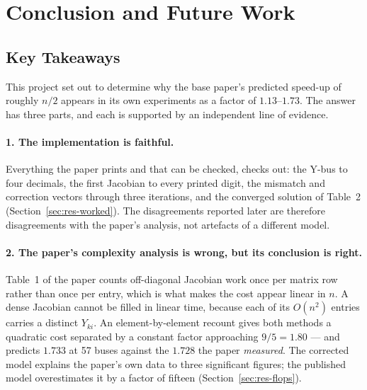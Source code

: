 \documentclass[sigconf,nonacm]{acmart}
\begin{document}
\section{Conclusion and Future Work}

\subsection{Key Takeaways}
This project set out to determine why the base paper's predicted speed-up of
roughly $n/2$ appears in its own experiments as a factor of $1.13$--$1.73$. The
answer has three parts, and each is supported by an independent line of
evidence.

\paragraph{1. The implementation is faithful.}
Everything the paper prints and that can be checked, checks out: the Y-bus to
four decimals, the first Jacobian to every printed digit, the mismatch and
correction vectors through three iterations, and the converged solution of
Table~2 (Section~\ref{sec:res-worked}). The disagreements reported later are
therefore disagreements with the paper's analysis, not artefacts of a different
model.

\paragraph{2. The paper's complexity analysis is wrong, but its conclusion is
right.}
Table~1 of the paper counts off-diagonal Jacobian work once per matrix row
rather than once per entry, which is what makes the cost appear linear in $n$. A
dense Jacobian cannot be filled in linear time, because each of its $O(n^2)$
entries carries a distinct $Y_{ki}$. An element-by-element recount gives both
methods a quadratic cost separated by a constant factor approaching
$9/5 = 1.80$ --- and predicts $1.733$ at 57 buses against the $1.728$ the paper
\emph{measured}. The corrected model explains the paper's own data to three
significant figures; the published model overestimates it by a factor of fifteen
(Section~\ref{sec:res-flops}).
\end{document}
